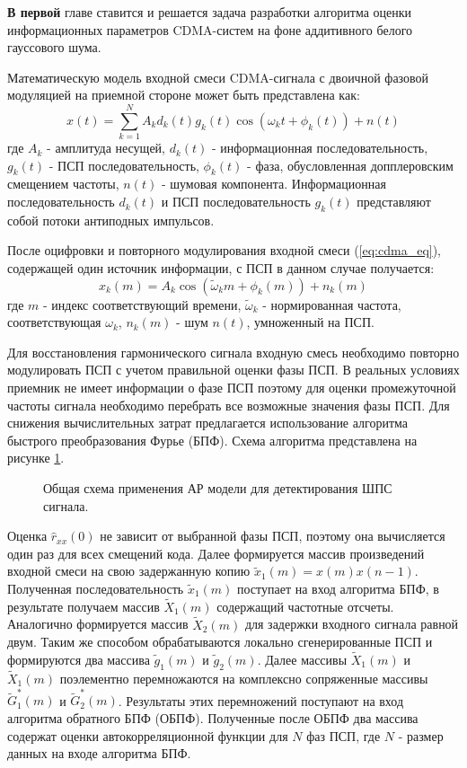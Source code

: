 {\bf{В первой}} главе ставится и решается задача разработки алгоритма оценки информационных параметров CDMA-систем на фоне аддитивного белого гауссового шума.

Математическую модель входной смеси CDMA-сигнала с двоичной фазовой модуляцией на приемной стороне может быть представлена как:
\begin{equation}
	\label{eq:cdma_eq}
	x(t)=\sum\limits_{k=1}^{N}A_k d_k(t)g_k(t)\cos{(\omega_{k}t + \phi_k(t))} + n(t)
\end{equation}
где ${A_k}$ - амплитуда несущей, ${d_k}(t)$ - информационная последовательность, ${g_k}(t)$ - ПСП последовательность, ${\phi_k(t)}$ - фаза, обусловленная допплеровским смещением частоты, 
${n(t)}$ - шумовая компонента. Информационная последовательность ${d_k}(t)$ и ПСП последовательность ${g_k}(t)$ представляют собой потоки антиподных импульсов.

После оцифровки и повторного модулирования входной смеси (\ref{eq:cdma_eq}), содержащей один источник информации, с ПСП в данном случае получается:
\begin{equation}
	\label{eq:cdma_strip_eq}
	x_k(m) = A_k \cos{(\tilde{\omega}_{k}m + \phi_k(m))} + n_k(m)
\end{equation}
где ${m}$ - индекс соответствующий времени, ${\tilde{\omega}_k}$ - нормированная частота, соответствующая ${\omega_k}$, ${n_k}(m)$ - шум ${n(t)}$, умноженный на ПСП.

Для восстановления гармонического сигнала входную смесь необходимо повторно модулировать ПСП с учетом правильной оценки фазы ПСП.
В реальных условиях приемник не имеет информации о фазе ПСП поэтому для оценки промежуточной частоты 
сигнала необходимо перебрать все возможные значения фазы ПСП. Для снижения вычислительных затрат предлагается использование алгоритма быстрого преобразования Фурье (БПФ).
Схема алгоритма представлена на рисунке \ref{pic:ar_cdma1_scheme2}.
\begin{figure}[h]
	\center{}
	\caption{Общая схема применения АР модели для детектирования ШПС сигнала.}
	\label{pic:ar_cdma1_scheme2}
\end{figure}

Оценка ${\hat{r}_{xx}(0)}$ не зависит от выбранной фазы ПСП, поэтому она вычисляется один
раз для всех смещений кода. Далее формируется массив произведений входной смеси на
свою задержанную копию ${\tilde{x}_1(m)=x(m)x(n-1)}$. Полученная последовательность  
${\tilde{x}_1(m)}$ поступает на вход алгоритма БПФ, в результате получаем массив ${\tilde{X}_1(m)}$
содержащий частотные отсчеты. Аналогично формируется массив  ${\tilde{X}_2(m)}$ для
задержки входного сигнала равной двум. Таким же способом обрабатываются локально
сгенерированные ПСП и формируются два массива ${\tilde{g}_1(m)}$ и ${\tilde{g}_2(m)}$.
Далее массивы ${\tilde{X}_1(m)}$ и ${\tilde{X}_1(m)}$ поэлементно перемножаются
на комплексно сопряженные массивы ${\tilde{G}_1^*(m)}$ и ${\tilde{G}_2^*(m)}$.
Результаты этих перемножений поступают на вход алгоритма обратного
БПФ (ОБПФ). Полученные после ОБПФ два массива содержат оценки автокорреляционной функции для ${N}$ 
фаз ПСП, где  ${N}$ - размер данных на входе алгоритма БПФ.

